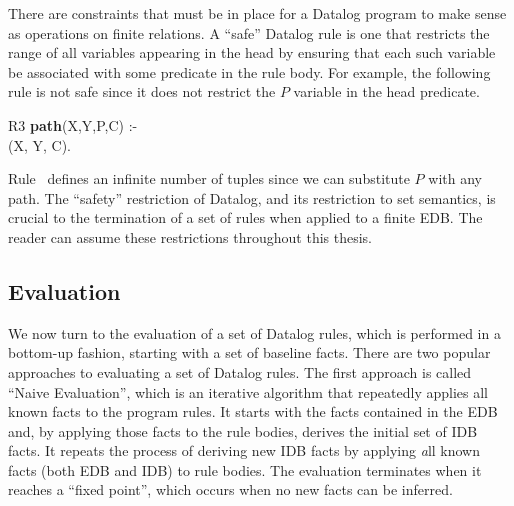 There are constraints that must be in place for a Datalog program to make
sense as operations on finite relations. A ``safe'' Datalog rule is one
that restricts the range of all variables appearing in the head by ensuring
that each such variable be associated with some predicate in the rule body.
For example, the following rule is not safe since it does not restrict the
$P$ variable in the  head predicate.

\begin{minipage}{\linewidth}
\ssp
R3 {\bf path}(X,Y,P,C) :- \\
(X, Y, C). \\
\end{minipage}

Rule~ defines an infinite number of  tuples since
we can substitute $P$ with any path. The ``safety'' restriction of 
Datalog, and its restriction to set semantics, is crucial to the
termination of a set of rules when applied to a finite EDB. The reader
can assume these restrictions throughout this thesis.

\subsection{Evaluation}

We now turn to the evaluation of a set of Datalog rules, which is performed in
a bottom-up fashion, starting with a set of baseline facts.  There are two
popular approaches to evaluating a set of Datalog rules.  The first approach is
called ``Naive Evaluation'', which is an iterative algorithm that repeatedly
applies all known facts to the program rules.  It starts with the facts
contained in the EDB and, by applying those facts to the rule bodies, derives
the initial set of IDB facts.  It repeats the process of deriving new IDB facts
by applying {\emph all} known facts (both EDB and IDB) to rule bodies.  The
evaluation terminates when it reaches a ``fixed point'', which occurs when no
new facts can be inferred.

